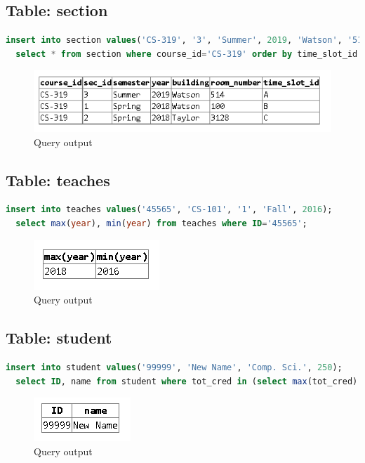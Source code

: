 \documentclass{article}
\begin{document}
\subsection{Table: section}
\begin{lstlisting}[language=sql]
  insert into section values('CS-319', '3', 'Summer', 2019, 'Watson', '514', 'A');
  select * from section where course_id='CS-319' order by time_slot_id asc
\end{lstlisting}
\begin{figure}[!ht]
  \begin{center}
  \includegraphics[scale=1]{sec.png}
  \caption{Query output}
  \end{center}
\end{figure}

\subsection{Table: teaches}
\begin{lstlisting}[language=sql]
  insert into teaches values('45565', 'CS-101', '1', 'Fall', 2016);
  select max(year), min(year) from teaches where ID='45565';
\end{lstlisting}
\begin{figure}[!ht]
  \begin{center}
  \includegraphics[scale=1]{teaches.png}
  \caption{Query output}
  \end{center}
\end{figure}

\subsection{Table: student}
\begin{lstlisting}[language=sql]
  insert into student values('99999', 'New Name', 'Comp. Sci.', 250);
  select ID, name from student where tot_cred in (select max(tot_cred) from student);
\end{lstlisting}
\begin{figure}[!ht]
  \begin{center}
  \includegraphics[scale=1]{student.png}
  \caption{Query output}
  \end{center}
\end{figure}
\end{document}
